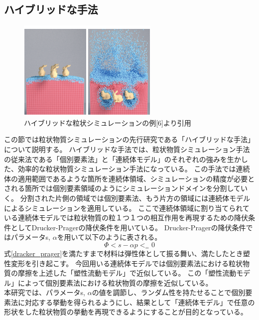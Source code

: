 \documentclass[12pt]{ltjsarticle}
\begin{document}
\subsection{ハイブリッドな手法}
\begin{figure}[htbp]
  \begin{center}
  \includegraphics*{hybrid_sample.png}
  \end{center}
\caption{ハイブリッドな粒状シミュレーションの例[6]より引用}
\end{figure}
この節では粒状物質シミュレーションの先行研究である「ハイブリッドな手法」について説明する。
ハイブリッドな手法では、粒状物質シミュレーション手法の従来法である「個別要素法」と「連続体モデル」のそれぞれの強みを生かした、効率的な粒状物質シミュレーション手法になっている。
この手法では連続体の適用範囲であるような箇所を連続体領域、シミュレーションの精度が必要とされる箇所では個別要素領域のようにシミュレーションドメインを分割していく。
分割された片側の領域では個別要素法、もう片方の領域には連続体モデルによるシミュレーションを適用している。
ここで連続体領域に割り当てられている連続体モデルでは粒状物質の粒１つ１つの相互作用を再現するための降伏条件としてDrucker-Pragerの降伏条件を用いている。
Drucker-Pragerの降伏条件ではパラメータs, $\alpha$を用いて以下のように表される。
\begin{equation}
  \Phi<s-\alpha p<_=0 
\end{equation}
\label{dracker_prager}
式\ref{dracker_prager}を満たすまで材料は弾性体として振る舞い、満たしたとき塑性変形を引き起こす。
今回用いる連続体モデルでは個別要素法における粒状物質の摩擦を上述した「塑性流動モデル」で近似している。
この「塑性流動モデル」によって個別要素法における粒状物質の摩擦を近似している。\\
本研究では、パラメータs, $\alpha$の値を調節し、ランダム性を持たせることで個別要素法に対応する挙動を得られるようにし、結果として「連続体モデル」で任意の形状をした粒状物質の挙動を再現できるようにすることが目的となっている。
\end{document}
